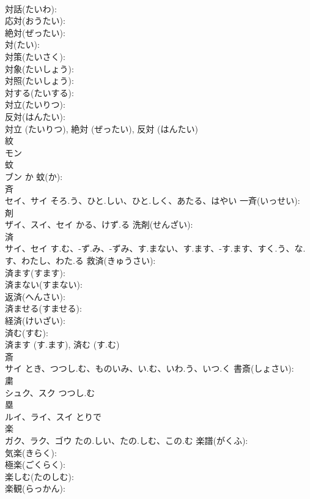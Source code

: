 \documentclass[8pt]{extreport}
\begin{document}
\begin{CJK}{UTF8}{min}
\\	対話(たいわ): 
\\	応対(おうたい): 
\\	絶対(ぜったい): 
\\	対(たい): 
\\	対策(たいさく): 
\\	対象(たいしょう): 
\\	対照(たいしょう): 
\\	対する(たいする): 
\\	対立(たいりつ): 
\\	反対(はんたい): 
\\	対立 (たいりつ), 絶対 (ぜったい), 反対 (はんたい)
\\	紋			
\\	モン			
\\	蚊			
\\	ブン	か	蚊(か): 
\\	斉			
\\	セイ、サイ	そろ.う、ひと.しい、ひと.しく、あたる、はやい	一斉(いっせい): 
\\	剤			
\\	ザイ、スイ、セイ	かる、けず.る	洗剤(せんざい): 
\\	済			
\\	サイ、セイ	す.む、-ず.み、-ずみ、す.まない、す.ます、-す.ます、すく.う、な.す、わたし、わた.る	救済(きゅうさい): 
\\	済ます(すます): 
\\	済まない(すまない): 
\\	返済(へんさい): 
\\	済ませる(すませる): 
\\	経済(けいざい): 
\\	済む(すむ): 
\\	済ます (す.ます), 済む (す.む)
\\	斎			
\\	サイ	とき、つつし.む、ものいみ、い.む、いわ.う、いつ.く	書斎(しょさい): 
\\	粛			
\\	シュク、スク	つつし.む		
\\	塁			
\\	ルイ、ライ、スイ	とりで		
\\	楽			
\\	ガク、ラク、ゴウ	たの.しい、たの.しむ、この.む	楽譜(がくふ): 
\\	気楽(きらく): 
\\	極楽(ごくらく): 
\\	楽しむ(たのしむ): 
\\	楽観(らっかん): 

\end{CJK}
\end{document}
